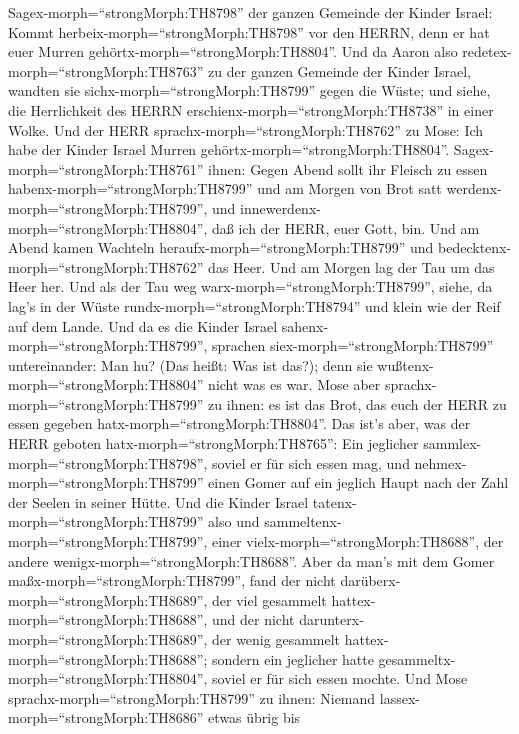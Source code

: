 Sagex-morph=``strongMorph:TH8798'' der ganzen Gemeinde der Kinder
Israel: Kommt herbeix-morph=``strongMorph:TH8798'' vor den HERRN, denn
er hat euer Murren gehörtx-morph=``strongMorph:TH8804''. 
Und da Aaron also redetex-morph=``strongMorph:TH8763'' zu der ganzen
Gemeinde der Kinder Israel, wandten sie
sichx-morph=``strongMorph:TH8799'' gegen die Wüste; und siehe, die
Herrlichkeit des HERRN erschienx-morph=``strongMorph:TH8738'' in einer
Wolke.  Und der HERR sprachx-morph=``strongMorph:TH8762''
zu Mose:  Ich habe der Kinder Israel Murren
gehörtx-morph=``strongMorph:TH8804''. Sagex-morph=``strongMorph:TH8761''
ihnen: Gegen Abend sollt ihr Fleisch zu essen
habenx-morph=``strongMorph:TH8799'' und am Morgen von Brot satt
werdenx-morph=``strongMorph:TH8799'', und
innewerdenx-morph=``strongMorph:TH8804'', daß ich der HERR, euer Gott,
bin.  Und am Abend kamen Wachteln
heraufx-morph=``strongMorph:TH8799'' und
bedecktenx-morph=``strongMorph:TH8762'' das Heer. Und am Morgen lag der
Tau um das Heer her.  Und als der Tau weg
warx-morph=``strongMorph:TH8799'', siehe, da lag's in der Wüste
rundx-morph=``strongMorph:TH8794'' und klein wie der Reif auf dem Lande.
 Und da es die Kinder Israel
sahenx-morph=``strongMorph:TH8799'', sprachen
siex-morph=``strongMorph:TH8799'' untereinander: Man hu? (Das heißt: Was
ist das?); denn sie wußtenx-morph=``strongMorph:TH8804'' nicht was es
war. Mose aber sprachx-morph=``strongMorph:TH8799'' zu ihnen: es ist das
Brot, das euch der HERR zu essen gegeben
hatx-morph=``strongMorph:TH8804''.  Das ist's aber, was der
HERR geboten hatx-morph=``strongMorph:TH8765'': Ein jeglicher
sammlex-morph=``strongMorph:TH8798'', soviel er für sich essen mag, und
nehmex-morph=``strongMorph:TH8799'' einen Gomer auf ein jeglich Haupt
nach der Zahl der Seelen in seiner Hütte.  Und die Kinder
Israel tatenx-morph=``strongMorph:TH8799'' also und
sammeltenx-morph=``strongMorph:TH8799'', einer
vielx-morph=``strongMorph:TH8688'', der andere
wenigx-morph=``strongMorph:TH8688''.  Aber da man's mit dem
Gomer maßx-morph=``strongMorph:TH8799'', fand der nicht
darüberx-morph=``strongMorph:TH8689'', der viel gesammelt
hattex-morph=``strongMorph:TH8688'', und der nicht
darunterx-morph=``strongMorph:TH8689'', der wenig gesammelt
hattex-morph=``strongMorph:TH8688''; sondern ein jeglicher hatte
gesammeltx-morph=``strongMorph:TH8804'', soviel er für sich essen
mochte.  Und Mose sprachx-morph=``strongMorph:TH8799'' zu
ihnen: Niemand lassex-morph=``strongMorph:TH8686'' etwas übrig bis
